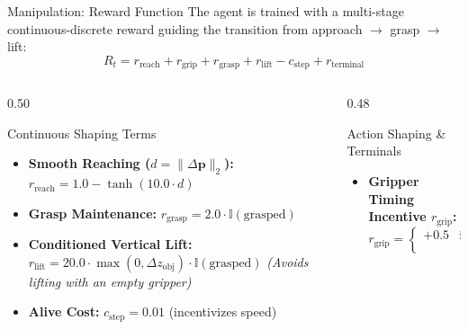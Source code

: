 \documentclass[10pt]{beamer}
\begin{document}
\begin{frame}{Manipulation: Reward Function}
    \small
    The agent is trained with a multi-stage continuous-discrete reward guiding the transition from approach $\to$ grasp $\to$ lift:
    \begin{equation*}
        R_t = r_{\text{reach}} + r_{\text{grip}} + r_{\text{grasp}} + r_{\text{lift}} - c_{\text{step}} + r_{\text{terminal}}
    \end{equation*}
    \vspace{-0.2cm}
    \begin{columns}[T]
        \begin{column}{0.50\textwidth}
            \begin{block}{Continuous Shaping Terms}
                \begin{itemize}\scriptsize
                    \item \textbf{Smooth Reaching ($d = \|\Delta\mathbf{p}\|_2$):}
                    \newline $r_{\text{reach}} = 1.0 - \tanh(10.0 \cdot d)$
                    \item \textbf{Grasp Maintenance:}
                    \newline $r_{\text{grasp}} = 2.0 \cdot \mathbb{I}(\text{grasped})$
                    \item \textbf{Conditioned Vertical Lift:}
                    \newline $r_{\text{lift}} = 20.0 \cdot \max(0, \Delta z_{\text{obj}}) \cdot \mathbb{I}(\text{grasped})$
                    \newline \textit{(Avoids lifting with an empty gripper)}
                    \item \textbf{Alive Cost:} $c_{\text{step}} = 0.01$ (incentivizes speed)
                \end{itemize}
            \end{block}
        \end{column}
        \begin{column}{0.48\textwidth}
            \begin{block}{Action Shaping \& Terminals}
                \begin{itemize}\scriptsize
                    \item \textbf{Gripper Timing Incentive $r_{\text{grip}}$:}
                    $$r_{\text{grip}} = \begin{cases}
                        +0.5 & \text{if } d < 4\,\text{cm} \land a_g > 0 \\

\end{cases}$$
\end{itemize}
\end{block}
\end{column}
\end{columns}
\end{frame}
\end{document}
